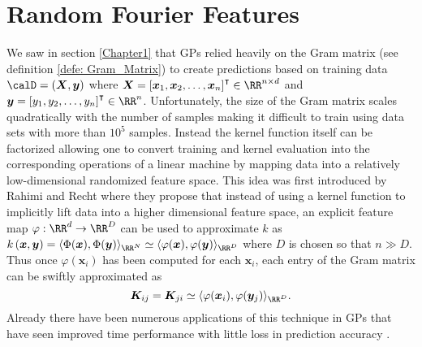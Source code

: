 \section{Random Fourier Features}\label{Chapter3}
We saw in section \ref{Chapter1} that GPs relied heavily on the Gram matrix (see definition \ref{defe: Gram_Matrix}) to create predictions based on training data $\calD = \left( \bm{X} , \bm{y} \right)$ where $\bm{X} = \left[ \bm{x}_1 , \bm{x}_2 , \ldots , \bm{x}_n \right]^{\intercal} \in \RR^{n \times d}$ and $\bm{y} = \left[ y_1 , y_2 , \ldots , y_n \right]^{\intercal} \in \RR^{n}$. Unfortunately, the size of the Gram matrix scales quadratically with the number of samples making it difficult to train using data sets with more than $10^5$ samples. Instead the kernel function itself can be factorized allowing one to convert training and kernel evaluation into the corresponding operations of a linear machine by mapping data into a relatively low-dimensional randomized feature space. This idea was first introduced by Rahimi and Recht \cite{NIPS2007_013a006f} where they propose that instead of using a kernel function to implicitly lift data into a higher dimensional feature space, an explicit feature map $\varphi : \RR^d \to \RR^D$ can be used to approximate $k$ as $k \left( \bm{x} , \bm{y} \right) = \langle \Phi (\bm{x}) , \Phi (\bm{y}) \rangle_{\RR^N} \simeq \langle \varphi (\bm{x}) , \varphi (\bm{y}) \rangle_{\RR^D}$ where $D$ is chosen so that $n \gg  D$. Thus once $\varphi (\bm{x}_i)$ has been computed for each $\bm{x}_i$, each entry of the Gram matrix can be swiftly approximated as
\[
    \bm{K}_{ij} = \bm{K}_{ji} \simeq \langle \varphi (\bm{x}_i) , \varphi (\bm{y}_j) \rangle_{\RR^D}.
\]
Already there have been numerous applications of this technique in GPs that have seen improved time performance with little loss in prediction accuracy \cite{PotapczynskiAndres2021BSGP}.





